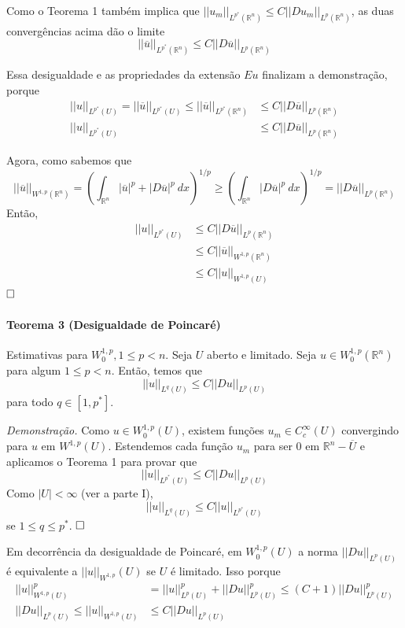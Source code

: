 \documentclass[11pt]{article}
\newcommand{\qed}{$\hfill\square$}
\newcommand{\Rn}{{\mathbb{R}^n}}
\newcommand{\nor}[2]{||#1||_{#2}}
\begin{document}
Como o Teorema 1 também implica que $ ||u_m||_{L^{p^*}(\Rn)} \leq C ||Du_m||_{L^p(\Rn)} $, as duas convergências acima dão o limite \[ ||\overline{u}||_{L^{p^*}(\Rn)} \leq C ||D\overline{u}||_{L^{p}(\Rn)} \]

Essa desigualdade e as propriedades da extensão $Eu$ finalizam a demonstração, porque \begin{align*}
	 ||u||_{L^{p^*}(U)} = ||\overline{u}||_{L^{p^*}(U)} \leq ||\overline{u}||_{L^{p^*}(\Rn)} &\leq  C ||D\overline{u}||_{L^{p}(\Rn)} \\
	  ||u||_{L^{p^*}(U)}  &\leq  C ||D\overline{u}||_{L^{p}(\Rn)}
\end{align*}

Agora, como sabemos que \[ ||\overline{u}||_{W^{1,p}(\Rn)} = \left( \int_\Rn |\overline{u}|^p + |D\overline{u}|^p\ dx \right)^{1/p} \geq \left(\int_\Rn |D\overline{u}|^p\ dx \right)^{1/p} = ||D\overline{u}||_{L^p(\Rn)}\] Então, \begin{align*}
	 ||u||_{L^{p^*}(U)}  &\leq  C ||D\overline{u}||_{L^{p}(\Rn)} \\
	  &\leq  C ||\overline{u}||_{W^{1,p}(\Rn)} \\
	  &\leq   C \nor{u}{W^{1,p}(U)} 
\end{align*}\qed





\paragraph{Teorema 3 (Desigualdade de Poincaré)}\label{t:sobolev-ineq-t3} Estimativas para \( W^{1,p}_0, 1 \leq p < n\). Seja \(U\) aberto e limitado. Seja $u \in W^{1,p}_0(\mathbb{R}^n)$ para algum \(1 \leq p < n\). Então, temos que \[ ||u||_{L^q(U)} \leq C ||Du||_{L^p(U)} \] para todo \( q \in [1, p^*]\). 

\textit{Demonstração.} Como $u \in W^{1,p}_0(U)$, existem funções $u_m \in C^\infty_c(U)$ convergindo para $u$ em $ W^{1,p}(U)$. Estendemos cada função $u_m$ para ser 0 em $\Rn-\overline{U}$ e aplicamos o Teorema 1 para provar que \[ ||u||_{L^{p^*}(U)} \leq C ||Du||_{L^p(U)} \] Como $ |U| < \infty  $ (ver a parte I), \[ ||u||_{L^q(U)} \leq C||u||_{L^{p^*}(U)} \] se $1 \leq q \leq p^*$. \qed

Em decorrência da desigualdade de Poincaré, em $ W^{1,p}_0(U) $ a norma $ ||Du||_{L^p(U)} $ é equivalente a $ ||u||_{W^{1,p}}(U) $ se $U$ é limitado. Isso porque \begin{align*}
	 ||u||_{W^{1,p}(U)}^p &= \nor{u}{L^p(U)}^p + \nor{Du}{L^p(U)}^p \leq (C + 1) \nor{Du}{L^p(U)}^p \\
	 \nor{Du}{L^p(U)} \leq ||u||_{W^{1,p}(U)} &\leq C \nor{Du}{L^p(U)}
\end{align*}
\end{document}
